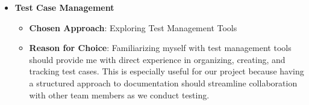 \documentclass[12pt, titlepage]{article}
\begin{document}
\begin{enumerate}
\begin{itemize}
\begin{itemize}
        \item \textbf{Test Case Management}
        \begin{itemize}
            \item \textbf{Chosen Approach}: Exploring Test Management Tools
            \item \textbf{Reason for Choice}: Familiarizing myself with test management tools should provide me with direct experience in organizing, creating, and tracking test cases. This is especially useful for our project because having a structured approach to documentation should streamline collaboration with other team members as we conduct testing.
        \end{itemize}
    \end{itemize}

\end{itemize}
\end{enumerate}
\end{document}
